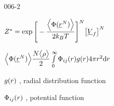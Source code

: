 \begin{mitframe}{006-2} %

    
    \begin{listone}
    
    \item $\configint = \exp\Bigg[-\dfrac{\Big\langle\pot(\uline{\pos}^{\nummoles})\Big\rangle}{2\boltz\Temp}\Bigg]^N\big[\uline{\vol}_{\fug}\big]^{\nummoles}$
    
    
    
    
    	\begin{listtwo}
    
    	\item $\Big\langle\pot(\uline{\pos}^{\nummoles})\Big\rangle \dfrac{\nummoles\big\langle\dens\big\rangle}{2}\int\limits_{0}^{\infty}\potfunc\raddist4\pie\pos^2\mathrm{d}\pos $
        
        
			\begin{listthree}

    		\item $\raddist$ , radial distribution function 
    		\item $\potfunc$ , potential function
    	
        	\end{listthree}
    
    	\end{listtwo}
    
    \end{listone}
    
\end{mitframe}